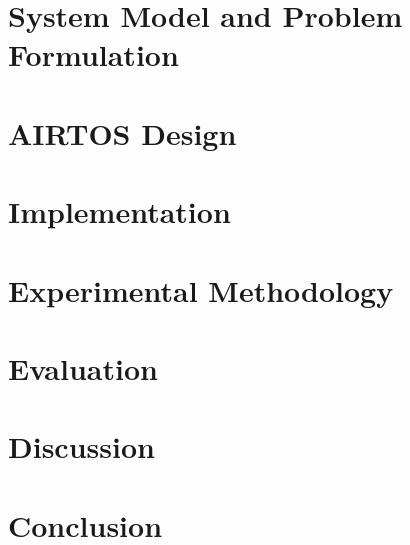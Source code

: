 \documentclass[lettersize,journal]{IEEEtran}
\begin{document}
\section{System Model and Problem Formulation}

\section{AIRTOS Design}

\section{Implementation}

\section{Experimental Methodology}

\section{Evaluation}

\section{Discussion}

\section{Conclusion}

\clearpage


\end{document}
